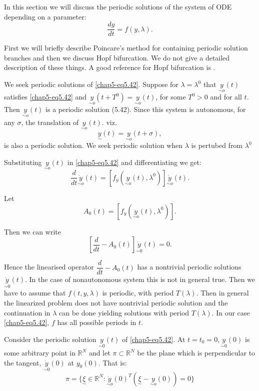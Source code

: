  In this section we will discuss the periodic solutions of the system
 of ODE depending on a parameter: 
  \begin{equation*}
\frac{dy}{dt}= f(y, \lambda). \tag{5.42}\label{chap5-eq5.42}
  \end{equation*} 
  
  First we will briefly describe Poincare's method for containing
  periodic solution branches and then we discuss Hopf bifurcation. We
  do not give a detailed description of these things. A good reference
  for Hopf bifurcation is \cite{key25}. 
  
  We seek periodic solutions of \eqref{chap5-eq5.42}. Suppose for $\lambda =
  \lambda^0$ that $\underset{\sim o}{y}(t)$ satisfies \eqref{chap5-eq5.42} and
  $\underset{\sim o}{y}(t+T^0) = \underset{\sim o}{y}(t)$, for some
  $T^0 > 0$ and  for all $t$. Then $\underset{\sim o}{y} (t)$ is a
  periodic solution (5.42). Since this system is autonomous, for any
  $\sigma$, the translation of $\underset{\sim o}{y} (t)$. viz. 
  $$
  \underset{\sim}{y} (t) = \underset{\sim o}{y}(t+\sigma), 
  $$
  is also a periodic solution. We seek  periodic solution when
  $\lambda$ is pertubed from $\lambda^0$ 
  
  Substituting  $\underset{\sim o}{y} (t)$ in \eqref{chap5-eq5.42} and
  differentiating we get: 
  $$
  \frac{d}{dt} \underset{\sim o}{\dot{y}} (t) = [f_y (\underset{\sim
      o}{y} (t), \lambda^0)] \underset{\sim o}{\dot{y}} (t). 
  $$
  
  Let
  $$
  A_0 (t) = [f_y(\underset{\sim o}{y} (t), \lambda^0)].
  $$
  
  Then we can write 
  $$
  [\frac{d}{dt}- A_0(t)] \underset{\sim 0}{\dot{y}}(t) =0.
  $$\pageoriginale

  Hence the linearised operator $\dfrac{d}{dt}-A_0 (t)$ has a
  nontrivial periodic solutions $\underset{\sim 0}{\dot{y}}(t)$. In
  the case of nonautonomous system this is not in general true. Then
  we have to assume that $f(t,y,\lambda)$ is periodic, with period
  $T(\lambda)$. Then in general the linearized problem does not have
  nontrivial periodic solution and the continuation in $\lambda$ can
  be done yielding solutions with period $T(\lambda)$. In our case
 \eqref{chap5-eq5.42}, $f$ has all possible periods in $t$. 
  
  Consider the periodic solution $\underset{\sim 0}{y}(t)$ of
  \eqref{chap5-eq5.42}. At $t=t_0 =0, \underset{\sim 0}{y}(0)$ is some
  arbitrary point in $\mathbb{R}^N$ and let $\pi \subset \mathbb{R}^N$ be the
  plane which is perpendicular to the tangent, $\underset{\sim
    0}{\dot{y}}(0)$ at $y_0(0)$. That is:   
  $$
  \pi = \{ \underset{\sim}{\xi} \in \mathbb{R}^N:
  \underset{\sim o}{\dot{y}}(0)^T ( \underset{\sim}{\xi}-
  \underset{\sim o}{y}(0)) =0 \} 
  $$
  
